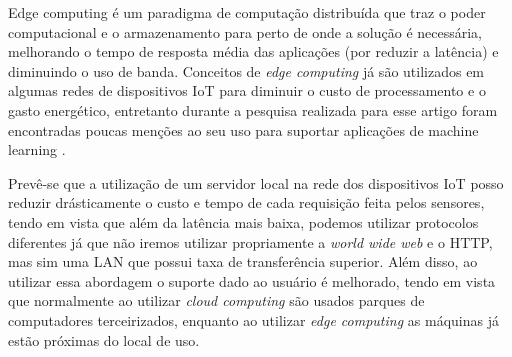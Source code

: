 \documentclass[12pt]{article}
\begin{document}
Edge computing é um paradigma de computação distribuída que traz o poder computacional e o armazenamento para perto de onde a solução é necessária, melhorando o tempo de resposta média das aplicações (por reduzir a latência) e diminuindo o uso de banda. Conceitos de \emph{edge computing} já são utilizados em algumas redes de dispositivos IoT para diminuir o custo de processamento e o gasto energético, entretanto durante a pesquisa realizada para esse artigo foram encontradas poucas menções ao seu uso para suportar aplicações de machine learning \cite{vitali}.

Prevê-se que a utilização de um servidor local na rede dos dispositivos IoT posso reduzir drásticamente o custo e tempo de cada requisição feita pelos sensores, tendo em vista que além da latência mais baixa, podemos utilizar protocolos diferentes já que não iremos utilizar propriamente a \emph{world wide web} e o HTTP, mas sim uma LAN que possui taxa de transferência superior. Além disso, ao utilizar essa abordagem o suporte dado ao usuário é melhorado, tendo em vista que normalmente ao utilizar \emph{cloud computing} são usados parques de computadores terceirizados, enquanto ao utilizar \emph{edge computing} as máquinas já estão próximas do local de uso.

\nocite{*}
\medskip



\end{document}
